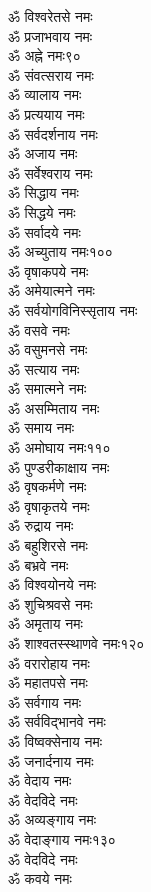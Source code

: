 \begin{multicols}{2}
\begin{flushleft}
ॐ विश्वरेतसे नमः\\
ॐ प्रजाभवाय नमः\\
ॐ अह्ने नमः\hfill ९०\\
ॐ संवत्सराय नमः\\
ॐ व्यालाय नमः\\
ॐ प्रत्ययाय नमः\\
ॐ सर्वदर्शनाय नमः\\
ॐ अजाय नमः\\
ॐ सर्वेश्वराय नमः\\
ॐ सिद्धाय नमः\\
ॐ सिद्धये नमः\\
ॐ सर्वादये नमः\\
ॐ अच्युताय नमः\hfill १००\\
ॐ वृषाकपये  नमः\\
ॐ अमेयात्मने नमः\\
ॐ सर्वयोगविनिस्सृताय नमः\\
ॐ वसवे नमः\\
ॐ वसुमनसे नमः\\
ॐ सत्याय नमः\\
ॐ समात्मने नमः\\
ॐ असम्मिताय नमः\\
ॐ समाय नमः\\
ॐ अमोघाय नमः\hfill ११०\\
ॐ पुण्डरीकाक्षाय नमः\\
ॐ वृषकर्मणे नमः\\
ॐ वृषाकृतये नमः\\
ॐ रुद्राय नमः\\
ॐ बहुशिरसे नमः\\
ॐ बभ्रवे नमः\\
ॐ विश्वयोनये नमः\\
ॐ शुचिश्रवसे नमः\\
ॐ अमृताय नमः\\
ॐ शाश्वतस्स्थाणवे नमः\hfill १२०\\
ॐ वरारोहाय नमः\\
ॐ महातपसे नमः\\
ॐ सर्वगाय नमः\\
ॐ सर्वविद्भानवे नमः\\
ॐ विष्वक्सेनाय नमः\\
ॐ जनार्दनाय नमः\\
ॐ वेदाय नमः\\
ॐ वेदविदे नमः\\
ॐ अव्यङ्गाय नमः\\
ॐ वेदाङ्गाय नमः\hfill १३०\\
ॐ वेदविदे नमः\\
ॐ कवये नमः\\

\end{flushleft}
\end{multicols}
